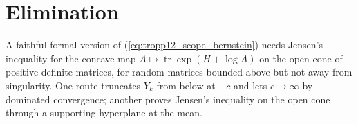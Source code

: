 \documentclass{article}
\begin{document}
\section{Elimination}

A faithful formal version of (\ref{eq:tropp12_scope_bernstein}) needs Jensen's
inequality for the concave map $A\mapsto\operatorname{tr}\exp(H+\log A)$ on the
open cone of positive definite matrices, for random matrices bounded above but
not away from singularity. One route truncates $Y_k$ from below at $-c$ and lets
$c\to\infty$ by dominated convergence; another proves Jensen's inequality on the
open cone through a supporting hyperplane at the mean.



\end{document}
